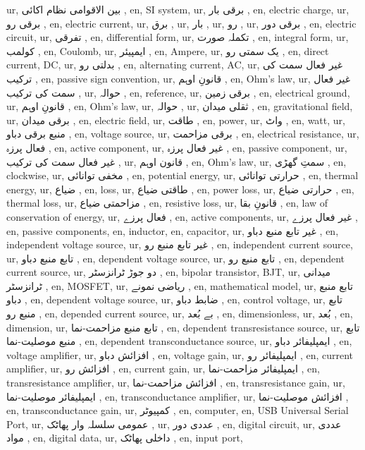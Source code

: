 ur, بین الاقوامی نظام اکائی ,
en, SI system,
ur, برقی بار ,
en, electric charge,
ur, برقی رو ,
en, electric current,
ur, برق ,
ur, بار ,
ur, رو ,
ur, برقی دور ,
en, electric circuit,
ur, تفرقی ,
en, differential form,
ur, تکملہ صورت ,
en, integral form,
ur, کولمب ,
en, Coulomb,
ur, ایمپیئر ,
en, Ampere,
ur, یک سمتی رو ,
en, direct current, DC,
ur, بدلتی رو ,
en, alternating current, AC,
ur, غیر فعال سمت کی ترکیب ,
en, passive sign convention,
ur, قانونِ اوہم ,
en, Ohm's law,
ur, غیر فعال سمت کی ترکیب ,
ur, حوالہ ,
en, reference,
ur, برقی زمین ,
en, electrical ground,
ur, قانونِ اوہم ,
en, Ohm's law,
ur, حوالہ ,
ur, ثقلی میدان ,
en, gravitational field,
ur, برقی میدان ,
en, electric field,
ur, طاقت ,
en, power,
ur, واٹ ,
en, watt,
ur, منبع برقی دباو ,
en, voltage source,
ur, برقی مزاحمت ,
en, electrical resistance,
ur, فعال پرزہ ,
en, active component,
ur, غیر فعال پرزہ ,
en, passive component,
ur, غیر فعال سمت کی ترکیب ,
ur, قانون اوہم ,
en, Ohm's law,
ur, سمتِ گھڑی ,
en, clockwise,
ur, مخفی توانائی ,
en, potential energy,
ur, حرارتی توانائی ,
en, thermal energy,
ur, ضیاع ,
en, loss,
ur, طاقتی ضیاع ,
en, power loss,
ur, حرارتی ضیاع ,
en, thermal loss,
ur, مزاحمتی ضیاع ,
en, resistive loss,
ur, قانونِ بقا ,
en, law of conservation of energy,
ur, فعال پرزے ,
en, active components,
ur, غیر فعال پرزے ,
en, passive components,
en, inductor,
en, capacitor,
ur, غیر تابع منبع دباو ,
en, independent voltage source,
ur, غیر تابع منبع رو ,
en, independent current source,
ur, تابع منبع دباو ,
en, dependent voltage source,
ur, تابع منبع رو ,
en, dependent current source,
ur, دو جوڑ ٹرانزسٹر ,
en, bipolar transistor, BJT,
ur, میدانی ٹرانزسٹر ,
en, MOSFET,
ur, ریاضی نمونے ,
en, mathematical model,
ur, تابع منبع دباو ,
en, dependent voltage source,
ur, ضابط دباو ,
en, control voltage,
ur, تابع منبع رو ,
en, depended current source,
ur, بے بُعد ,
en, dimensionless,
ur, بُعد ,
en, dimension,
ur, تابع منبع مزاحمت-نما ,
en, dependent transresistance source,
ur, تابع منبع موصلیت-نما ,
en, dependent transconductance source,
ur, ایمپلیفائر دباو ,
en, voltage amplifier,
ur, افزائش دباو ,
en, voltage gain,
ur, ایمپلیفائر رو ,
en, current amplifier,
ur, افزائش رو ,
en, current gain,
ur, ایمپلیفائر مزاحمت-نما ,
en, transresistance amplifier,
ur, افزائش مزاحمت-نما ,
en, transresistance gain,
ur, ایمپلیفائر موصلیت-نما ,
en, transconductance amplifier,
ur, افزائش موصلیت-نما ,
en, transconductance gain,
ur, کمپیوٹر ,
en, computer,
en, USB Universal Serial Port,
ur, عمومی سلسلہ وار پھاٹک ,
ur, عددی دور ,
en, digital circuit,
ur, عددی مواد ,
en, digital data,
ur, داخلی پھاٹک ,
en, input port,
